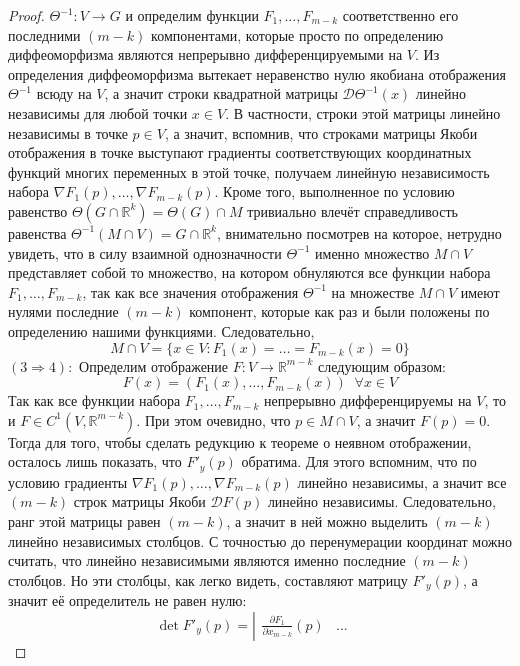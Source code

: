 \documentclass[11pt]{article}
\begin{document}
\begin{proof}
    $\Theta^{-1} \colon V \to G$ и определим функции $F_1, \dots, F_{m-k}$ соответственно его последними $(m - k)$
    компонентами, которые просто по определению диффеоморфизма являются непрерывно дифференцируемыми на $V$. Из определения диффеоморфизма вытекает неравенство нулю якобиана отображения $\Theta^{-1}$ всюду на $V$, а значит строки квадратной матрицы $\mathcal{D}\Theta^{-1}(x)$ линейно независимы для любой точки $x \in V$. В частности, строки этой матрицы линейно независимы в точке $p \in V$, а значит, вспомнив, что строками матрицы Якоби отображения в точке выступают градиенты соответствующих координатных функций многих переменных в этой точке, получаем линейную независимость набора $\nabla F_1(p), \ldots, \nabla F_{m-k}(p)$. Кроме того, выполненное по условию равенство $\Theta(G \cap \mathbb{R}^k) = \Theta(G) \cap M$ тривиально влечёт справедливость равенства $\Theta^{-1} (M \cap V) = G \cap \mathbb{R}^k$, внимательно посмотрев на которое, нетрудно увидеть, что в силу взаимной однозначности $\Theta^{-1}$ именно множество $M \cap V$ представляет собой то множество, на котором обнуляются все функции набора $F_1, \ldots, F_{m - k}$, так как все значения отображения $\Theta^{-1}$ на множестве $M \cap V$ имеют нулями последние $(m - k)$ компонент, которые как раз и были положены по определению нашими функциями. Следовательно, 
    \[M \cap V = \{x \in V: F_1(x) = \ldots = F_{m-k}(x) = 0\}\]
    $(3 \Longrightarrow 4):$ Определим отображение $F \colon V \to \mathbb{R}^{m - k}$ следующим образом:
    \[F(x) = \left(F_1(x), \ldots, F_{m - k}(x)\right) \; \; \forall x \in V\]
    Так как все функции набора $F_1, \ldots, F_{m - k}$ непрерывно дифференцируемы на $V$, то и $F \in C^1 (V, \mathbb{R}^{m - k})$. При этом очевидно, что $p \in M \cap V$, а значит $F(p) = 0$. Тогда для того, чтобы сделать редукцию к теореме о неявном отображении, осталось лишь показать, что $F'_y (p)$ обратима. Для этого вспомним, что по условию градиенты $\nabla F_1 (p), \ldots, \nabla F_{m - k} (p)$ линейно независимы, а значит все $(m - k)$ строк матрицы Якоби $\mathcal{D}F (p)$ линейно независимы. Следовательно, ранг этой матрицы равен $(m - k)$, а значит в ней можно выделить $(m - k)$ линейно независимых столбцов. С точностью до перенумерации координат можно считать, что линейно независимыми являются именно последние $(m - k)$ столбцов. Но эти столбцы, как легко видеть, составляют матрицу $F'_y (p)$, а значит её определитель не равен нулю:
    \[\det F'_y (p) =  \left|\begin{matrix}
        \displaystyle \frac{\partial F_1}{\partial x_{m-k}}(p) & \dots & 

\end{matrix}\]
\end{proof}
\end{document}
